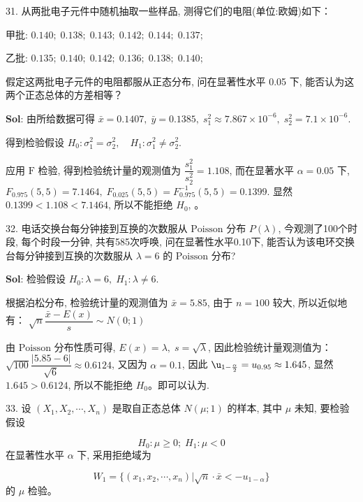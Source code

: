 

31. 从两批电子元件中随机抽取一些样品, 测得它们的电阻(单位:欧姆)如下： \par 
甲批: $0.140;\;0.138;\;0.143;\;0.142;\;0.144;\;0.137;\;$  \par
乙批: $0.135;\;0.140;\;0.142;\;0.136;\;0.138;\;0.140;\;$

假定这两批电子元件的电阻都服从正态分布, 问在显著性水平 0.05 下, 能否认为这两个正态总体的方差相等？

\textbf{Sol}: 由所给数据可得 $\bar{x}=0.1407,\;\bar{y}=0.1385,\;s_1^2\approx7.867\times 10^{-6},\;s_2^2=7.1\times10^{-6}$.

得到检验假设 $H_0:\sigma_1^2=\sigma_2^2,\quad H_1:\sigma_1^2\not=\sigma_2^2$.

应用 $\text{F}$ 检验, 得到检验统计量的观测值为 $\dfrac{s_1^2}{s_2^2}=1.108$, 而在显著水平 $\alpha=0.05$ 下, $F_{0.975}(5,5)=7.1464,\;F_{0.025}(5,5)=F^{-1}_{0.975}(5,5)=0.1399$. 显然 $0.1399<1.108<7.1464$, 
所以不能拒绝 $H_0$, 
。


\vspace{12pt}

32. 电话交换台每分钟接到互换的次数服从 $\text{Poisson}$ 分布 $P(\lambda)$, 今观测了100个时段, 每个时段一分钟, 共有585次呼唤, 问在显著性水平0.10下, 能否认为该电环交换台每分钟接到互换的次数服从 $\lambda=6$ 的 $\text{Poisson}$ 分布?

\textbf{Sol}: 检验假设 $H_0:\lambda=6,\;H_1:\lambda\not=6$.

根据泊松分布, 检验统计量的观测值为 $\bar{x}=5.85$, 
由于 $n=100$ 较大, 所以近似地有： $\sqrt{n}\dfrac{\bar{x}-E(x)}{s}\sim N(0;1)$

由 $\text{Poisson}$ 分布性质可得, $E(x)=\lambda,\;s=\sqrt{\lambda}$, 因此检验统计量观测值为：$\sqrt{100}\dfrac{|5.85-6|}{\sqrt{6}}\approx0.6124$, 又因为 $\alpha=0.1$, 因此 $\u_{1-\frac{\alpha}{2}}=u_{0.95}\approx1.645$, 显然 $1.645>0.6124$, 所以不能拒绝 $H_0$。即可以认为.




\vspace{12pt}

33. 设 $(X_1,X_2,\cdots,X_n)$ 是取自正态总体 $N(\mu;1)$ 的样本, 其中 $\mu$ 未知, 要检验假设

$$
H_0:\mu\geqslant0;\;H_1:\mu<0
$$
在显著性水平 $\alpha$ 下, 采用拒绝域为

$$
W_1=\big\{(x_1,x_2,\cdots,x_n)\big|\sqrt{n}\cdot\bar{x}<-u_{1-\alpha}\big\}
$$
的 $\mu$ 检验。

